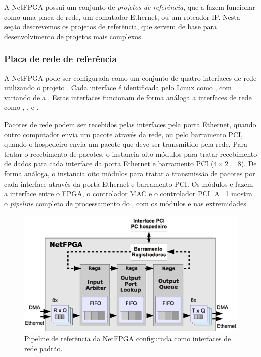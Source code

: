 A NetFPGA possui um conjunto de \emph{projetos de referência}, que a
fazem funcionar como uma placa de rede, um comutador Ethernet, ou um
roteador IP.  Nesta seção descrevemos os projetos de referência, que
servem de base para desenvolvimento de projetos mais complexos.

\subsubsection*{Placa de rede de referência}

A NetFPGA pode ser configurada como um conjunto de quatro interfaces de
rede utilizando o projeto .  Cada interface é
identificada pelo Linux como , com  variando de
 a .  Estas interfaces funcionam de forma análoga a
interfaces de rede como , , e .

Pacotes de rede podem ser recebidos pelas interfaces  pela
porta Ethernet, quando outro computador envia um pacote através da rede,
ou pelo barramento PCI, quando o hospedeiro envia um pacote que deve ser
transmitido pela rede.  Para tratar o recebimento de pacotes, o
 instancia oito módulos  para tratar
recebimento de dados para cada interface da porta Ethernet e barramento
PCI ($4 \times 2 = 8$).  De forma análoga, o 
instancia oito módulos  para tratar a transmissão de
pacotes por cada interface através da porta Ethernet e barramento PCI.
Os módulos  e  fazem a interface entre o
FPGA, o controlador MAC e o controlador PCI.  A
\figstr~\ref{fig:arch.pipe.iface} mostra o \emph{pipeline} completo de
processamento do , com os módulos  e
 nas extremidades.

\begin{figure}
\centering
\includegraphics[scale=0.6,angle=0]{figures/modulos/datapathhor2.eps}
\caption{Pipeline de referência da NetFPGA configurada como interfaces de rede padrão.}
\label{fig:arch.pipe.iface}
\end{figure}

